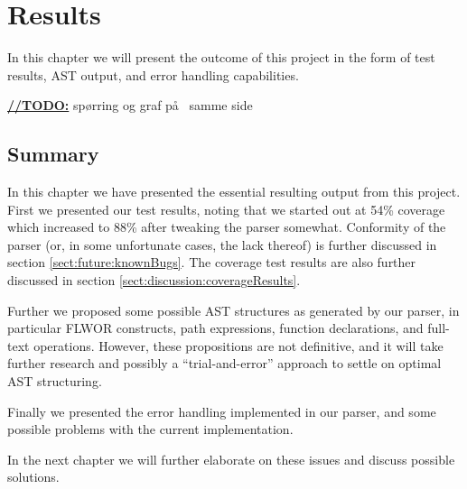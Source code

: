 \chapter{Results}
\label{chapter:results}
In this chapter we will present the outcome of this project in the form of test
results, AST output, and error handling capabilities.

\underline{\textbf{\LARGE //TODO:}} sp\o rring og graf p\aa~ samme side





\section{Summary}
In this chapter we have presented the essential resulting output from this
project. First we presented our test results, noting that we started out at   
54\% coverage which increased to 88\% after tweaking the parser somewhat.
Conformity of the parser (or, in some unfortunate cases, the lack thereof) is
further  discussed in section \ref{sect:future:knownBugs}. The coverage test
results are also further discussed in section
\ref{sect:discussion:coverageResults}.

Further we proposed some possible AST structures as generated by our parser, in
particular FLWOR constructs, path expressions, function declarations, and
full-text operations. However, these propositions are not definitive, and it
will take further research and possibly a ``trial-and-error'' approach to settle
on optimal AST structuring.

Finally we presented the error handling implemented in our parser, and some
possible problems with the current implementation. 

In the next chapter we will further elaborate on these issues and discuss
possible solutions.